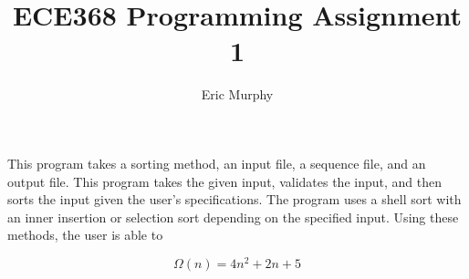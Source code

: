 \documentclass{article}
\begin{document}
\title{ECE368 Programming Assignment 1}
\author{Eric Murphy}

\maketitle

\indent
This program takes a sorting method, an input file, a sequence file, and an output file.  This program takes the given input, validates the input, and then sorts the input given the user's specifications.  The program uses a shell sort with an inner insertion or selection sort depending on the specified input.  Using these methods, the user is able to 

\begin{equation}
  \Omega (n) = 4n^2 + 2n + 5
\end{equation}
\end{document}
